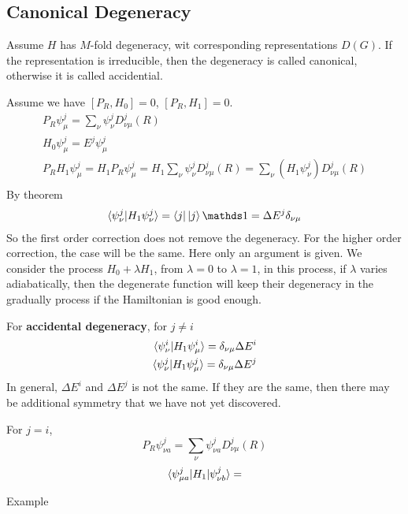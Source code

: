 \subsection{Canonical Degeneracy}
\label{sec:Canonical-Degeneracy}
\begin{defi}
    Assume $H$ has $M$-fold degeneracy, wit corresponding
    representations $D(G)$. If the representation is irreducible, then
    the degeneracy is called canonical, otherwise it is called
    accidential.
\end{defi}

Assume we have $[P_R,H_0]=0$, $[P_R,H_1]=0$. 
\begin{align}
    P_R \psi^j_\mu = \sum_\nu \psi^j_\nu D^j_{\nu\mu}(R)\\
    H_0 \psi^j_\mu = E^j \psi^j_\mu \\
    P_R H_1 \psi^j_\mu = H_1 P_R \psi^j_\mu = H_1 \sum_\nu \psi^j_\nu
    D^j_{\nu\mu}(R) = \sum_\nu (H_1\psi^j_\nu) D^j_{\nu\mu}(R) \\
\end{align}
By theorem
\begin{align}
    \braket{\psi^j_\nu|H_1 \psi^j_\nu} = \bra{j}\ket{j}\id = \Delta
    E^j \delta_{\nu\mu}
\end{align}
So the first order correction does not remove the degeneracy. For the
higher order correction, the case will be the same. Here only an
argument is given. We consider the process $H_0 + \lambda H_1$, from
$\lambda=0$ to $\lambda=1$, in this process, if $\lambda$ varies
adiabatically, then the degenerate function will keep their degeneracy
in the gradually process if the Hamiltonian is good enough. 

For \textbf{accidental degeneracy}, for $j\neq i$
\begin{align}
    \braket{\psi^i_\nu|H_1 \psi^i_\mu} = \delta_{\nu\mu} \Delta E^i \\
    \braket{\psi^j_\nu|H_1 \psi^j_\mu} = \delta_{\nu\mu} \Delta E^j \\
\end{align}
In general, $\Delta E^i$ and $\Delta E^j$ is not the same. If they are
the same, then there may be additional symmetry that we have not yet
discovered.

For $j=i$, 
\begin{equation}
P_R \psi^j_{\nu a} = \sum_\nu \psi^j_{\nu a} D^j_{\nu\mu}(R)
\end{equation}
\begin{align}
    \braket{\psi^j_{\mu a} | H_1 |\psi^j_{\nu b}}  = 
\end{align}

Example
